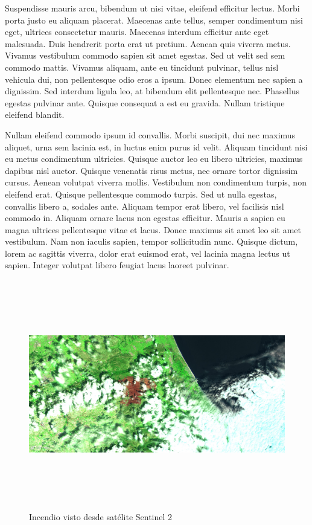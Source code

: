\documentclass[a4paper,11pt]{article}
\begin{document}
Suspendisse mauris arcu, bibendum ut nisi vitae, eleifend efficitur lectus. Morbi porta justo eu aliquam placerat. Maecenas ante tellus, semper condimentum nisi eget, ultrices consectetur mauris. Maecenas interdum efficitur ante eget malesuada. Duis hendrerit porta erat ut pretium. Aenean quis viverra metus. Vivamus vestibulum commodo sapien sit amet egestas. Sed ut velit sed sem commodo mattis. Vivamus aliquam, ante eu tincidunt pulvinar, tellus nisl vehicula dui, non pellentesque odio eros a ipsum. Donec elementum nec sapien a dignissim. Sed interdum ligula leo, at bibendum elit pellentesque nec. Phasellus egestas pulvinar ante. Quisque consequat a est eu gravida. Nullam tristique eleifend blandit.

Nullam eleifend commodo ipsum id convallis. Morbi suscipit, dui nec maximus aliquet, urna sem lacinia est, in luctus enim purus id velit. Aliquam tincidunt nisi eu metus condimentum ultricies. Quisque auctor leo eu libero ultricies, maximus dapibus nisl auctor. Quisque venenatis risus metus, nec ornare tortor dignissim cursus. Aenean volutpat viverra mollis. Vestibulum non condimentum turpis, non eleifend erat. Quisque pellentesque commodo turpis. Sed ut nulla egestas, convallis libero a, sodales ante. Aliquam tempor erat libero, vel facilisis nisl commodo in. Aliquam ornare lacus non egestas efficitur. Mauris a sapien eu magna ultrices pellentesque vitae et lacus. Donec maximus sit amet leo sit amet vestibulum. Nam non iaculis sapien, tempor sollicitudin nunc. Quisque dictum, lorem ac sagittis viverra, dolor erat euismod erat, vel lacinia magna lectus ut sapien. Integer volutpat libero feugiat lacus laoreet pulvinar.

\begin{figure}[h]
	\centering
	\includegraphics[width=150mm,height=100mm]{figura3}
	\caption{Incendio visto desde satélite Sentinel 2}
	\label{Figura}
\end{figure}
\end{document}
